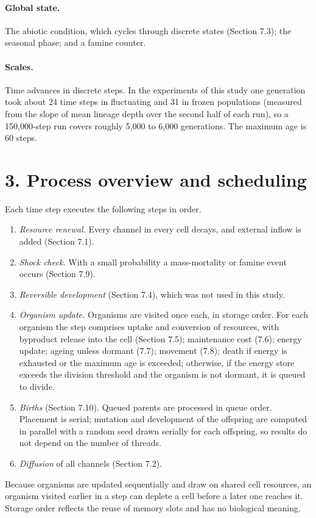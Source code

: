 \paragraph*{Global state.} The abiotic condition, which cycles through discrete
states (Section 7.3); the seasonal phase; and a famine counter.

\paragraph*{Scales.} Time advances in discrete steps. In the experiments of this study one generation took about 24 time steps in fluctuating and 31 in frozen
populations (measured from the slope of mean lineage depth over the second half of
each run), so a 150{,}000-step run covers roughly 5{,}000 to 6{,}000 generations.
The maximum age is 60 steps.

\section*{3. Process overview and scheduling}
Each time step executes the following steps in order.
\begin{enumerate}
\item \emph{Resource renewal.} Every channel in every cell decays, and external
  inflow is added (Section 7.1).
\item \emph{Shock check.} With a small probability a mass-mortality or famine event
  occurs (Section 7.9).
\item \emph{Reversible development} (Section 7.4), which was not used in this study.
\item \emph{Organism update.} Organisms are visited once each, in storage order.
  For each organism the step comprises uptake and conversion of resources, with byproduct release into the
  cell (Section 7.5); maintenance cost (7.6); energy update; ageing unless
  dormant (7.7); movement (7.8); death if energy is exhausted or the maximum age is
  exceeded; otherwise, if the energy store exceeds the division threshold and the
  organism is not dormant, it is queued to divide.
\item \emph{Births} (Section 7.10). Queued parents are processed in queue order.
  Placement is serial; mutation and development of the offspring are computed in
  parallel with a random seed drawn serially for each offspring, so results do not
  depend on the number of threads.
\item \emph{Diffusion} of all channels (Section 7.2).
\end{enumerate}
Because organisms are updated sequentially and draw on shared cell resources, an
organism visited earlier in a step can deplete a cell before a later one reaches
it. Storage order reflects the reuse of memory slots and has no biological meaning.

